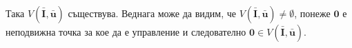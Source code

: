 

Така $V(\bar{\mathbf{I}}, \bar{\mathbf{u}})$ съществува. Веднага може да видим, че $V(\bar{\mathbf{I}}, \bar{\mathbf{u}}) \neq \emptyset$, понеже $\mathbf{0}$ е неподвижна точка за кое да е управление и следователно $\mathbf{0} \in V(\bar{\mathbf{I}}, \bar{\mathbf{u}})$.
